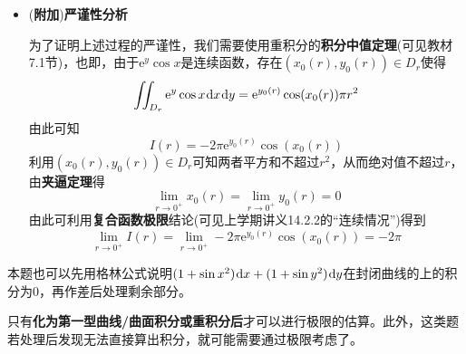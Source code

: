 \documentclass[a4paper,UTF8,fontset=windows,AutoFakeBold]{ctexart}
\newcommand*{\dr}{\hspace{0.07em}\mathrm{d}}
\newcommand*{\er}{\mathrm{e}}
\newcommand*{\extra}{\textbf{附加}}
\newcommand*{\note}{\noindent *}
\theoremstyle{ex}
\begin{document}
\begin{framed}
{\begin{itemize}
        直接换元计算会发现，上述的重积分虽然看起来简单，实际是非常难计算的。不过，一个重要的观察是，由于任取充分小的$r$都可以推出相同的式子，上式对任何$r$应当\textbf{相等}。也即记
        $$I(r)=-\frac{2}{r^2}\iint_{D_r}\er^y\cos x\dr x\dr y$$
        存在$\varepsilon>0$使得$0<r<\varepsilon$时$I(r)$为常数。由此，我们只需计算
        $$\lim_{r\to0^+}I(r)$$
        它必然与$I(r)$的值相等。

        \note 这样的\textbf{极限思路}事实上也是高等数学更一般的重要应用之一，也即通过极限将不精确的估算转化为精确的计算结果。

        由于$D_r$是满足$x^2+y^2\le r^2$的区域，在$r$接近0时应接近$(0,0)$，而被积函数在$(0,0)$处的值为1，且连续，因此$(0,0)$附近应接近1，这就得到积分结果约为$D_r$的面积$\pi r^2$，从而极限应当是
        $$-\frac{2}{r^2}\cdot\pi r^2=-2\pi$$
        这样就算出了形式上的结果。

        \item (\extra)\textbf{严谨性分析}
        
        为了证明上述过程的严谨性，我们需要使用重积分的\textbf{积分中值定理}(可见教材7.1节)，也即，由于$\er^y\cos x$是连续函数，存在$(x_0(r),y_0(r))\in D_r$使得
        $$\iint_{D_r}\er^y\cos x\dr x\dr y=\er^{y_0(r)}\cos(x_0(r))\pi r^2$$
        由此可知
        $$I(r)=-2\pi\er^{y_0(r)}\cos(x_0(r))$$
        利用$(x_0(r),y_0(r))\in D_r$可知两者平方和不超过$r^2$，从而绝对值不超过$r$，由\textbf{夹逼定理}得
        $$\lim_{r\to0^+}x_0(r)=\lim_{r\to0^+}y_0(r)=0$$
        由此可利用\textbf{复合函数极限}结论(可见上学期讲义14.2.2的``连续情况'')得到
        $$\lim_{r\to0^+}I(r)=\lim_{r\to0^+}-2\pi\er^{y_0(r)}\cos(x_0(r))=-2\pi$$
    \end{itemize}

    \note 本题也可以先用格林公式说明$(1+\sin x^2)\dr x+(1+\sin y^2)\dr y$在封闭曲线的上的积分为0，再作差后处理剩余部分。
}
\end{framed}

\note 只有\textbf{化为第一型曲线/曲面积分或重积分后}才可以进行极限的估算。此外，这类题若处理后发现无法直接算出积分，就可能需要通过极限考虑了。

\
\end{document}
